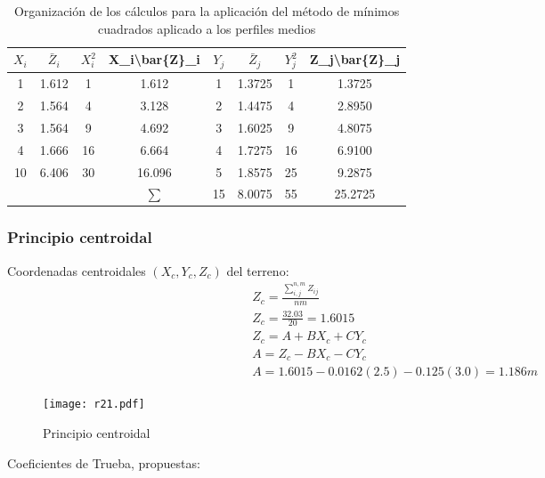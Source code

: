 \begin{table}[h!]
  \centering
  \begin{tabular}{@{}cccccccc@{}}
  \toprule
  $X_i$ & $\bar{Z}_i$ & $X_i^2$ & X\_i\textbackslash{}bar\{Z\}\_i & $Y_j$ & $\bar{Z}_j$ & $Y_j^2$ & Z\_j\textbackslash{}bar\{Z\}\_j \\ \midrule
  1  & 1.612 & 1  & 1.612  & 1  & 1.3725 & 1  & 1.3725  \\
  2  & 1.564 & 4  & 3.128  & 2  & 1.4475 & 4  & 2.8950  \\
  3  & 1.564 & 9  & 4.692  & 3  & 1.6025 & 9  & 4.8075  \\
  4  & 1.666 & 16 & 6.664  & 4  & 1.7275 & 16 & 6.9100  \\
  10 & 6.406 & 30 & 16.096 & 5  & 1.8575 & 25 & 9.2875  \\
     &       &    & $\sum$ & 15 & 8.0075 & 55 & 25.2725 \\ \bottomrule
  \end{tabular}
  \caption{Organización de los cálculos para la aplicación del método de mínimos cuadrados aplicado a los perfiles medios}
  \label{tabr6}
\end{table}
\subsubsection{Principio centroidal}
Coordenadas centroidales $(X_c, Y_c, Z_c)$ del terreno:
\begin{align*}
  &Z_c = \frac{\sum_{i,j}^{n,m} Z_{ij}}{nm}\\
  &Z_c = \frac{32.03}{20} = 1.6015\\
  &Z_c = A + BX_c + CY_c\\
  &A = Z_c - BX_c - CY_c\\
  &A = 1.6015 - 0.0162(2.5) -0.125(3.0) = 1.186 m
\end{align*}
\begin{figure}[h!]
\centering
\texttt{[image: r21.pdf]}
\caption{Principio centroidal}
\label{r21}
\end{figure}
Coeficientes de Trueba, propuestas:

